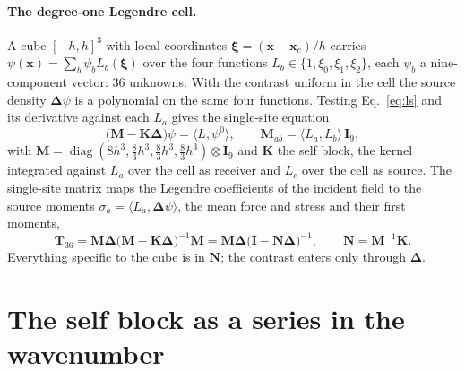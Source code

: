 \documentclass[11pt,a4paper]{article}
\newcommand{\bK}{\mathbf{K}}
\newcommand{\bM}{\mathbf{M}}
\newcommand{\bN}{\mathbf{N}}
\newcommand{\bT}{\mathbf{T}}
\newcommand{\bI}{\mathbf{I}}
\newcommand{\bx}{\mathbf{x}}
\newcommand{\bD}{\boldsymbol{\Delta}}
\newcommand{\bxi}{\boldsymbol{\xi}}
\begin{document}
\paragraph{The degree-one Legendre cell.} A cube $[-h,h]^3$ with local coordinates $\bxi=(\bx-\bx_c)/h$ carries
$\psi(\bx)=\sum_b\psi_bL_b(\bxi)$ over the four functions $L_b\in\{1,\xi_0,\xi_1,\xi_2\}$, each $\psi_b$ a
nine-component vector: $36$ unknowns. With the contrast uniform in the cell the source density
$\bD\psi$ is a polynomial on the same four functions. Testing Eq.~\eqref{eq:ls} and its derivative against
each $L_a$ gives the single-site equation \citep{NestorCoupling2026}
\begin{equation}\label{eq:sitels}
  \bigl(\bM-\bK\bD\bigr)\psi=\langle L,\psi^0\rangle,\qquad \bM_{ab}=\langle L_a,L_b\rangle\,\bI_9,
\end{equation}
with $\bM=\operatorname{diag}(8h^3,\tfrac83h^3,\tfrac83h^3,\tfrac83h^3)\otimes\bI_9$ and $\bK$ the self block,
the kernel integrated against $L_a$ over the cell as receiver and $L_c$ over the cell as source. The
single-site matrix maps the Legendre coefficients of the incident field to the source moments
$\sigma_a=\langle L_a,\bD\psi\rangle$, the mean force and stress and their first moments,
\begin{equation}\label{eq:t36}
  \bT_{36}=\bM\bD\bigl(\bM-\bK\bD\bigr)^{-1}\bM=\bM\bD\bigl(\bI-\bN\bD\bigr)^{-1},\qquad\bN=\bM^{-1}\bK .
\end{equation}
Everything specific to the cube is in $\bN$; the contrast enters only through $\bD$.

\section{The self block as a series in the wavenumber}\label{sec:series}
\end{document}

